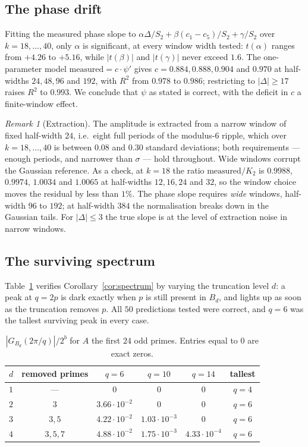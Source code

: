 \documentclass[11pt,a4paper]{article}
\theoremstyle{plain}
\theoremstyle{definition}
\theoremstyle{remark}
\newtheorem{remark}[theorem]{Remark}
\begin{document}
\subsection{The phase drift}

Fitting the measured phase slope to
$\alpha\Delta/S_2+\beta(c_1-c_5)/S_2+\gamma/S_2$ over $k=18,\dots,40$, only
$\alpha$ is significant, at every window width tested: $t(\alpha)$ ranges from
$+4.26$ to $+5.16$, while $|t(\beta)|$ and $|t(\gamma)|$ never exceed $1.6$. The
one-parameter model $\text{measured}=c\cdot\psi'$ gives $c=0.884,0.888,0.904$
and $0.970$ at half-widths $24,48,96$ and $192$, with $R^{2}$ from $0.978$ to
$0.986$; restricting to $|\Delta|\ge17$ raises $R^{2}$ to $0.993$. We conclude
that $\psi$ as stated is correct, with the deficit in $c$ a finite-window
effect.

\begin{remark}[Extraction]\label{rem:extraction}
The amplitude is extracted from a narrow window of fixed half-width $24$, i.e.\
eight full periods of the modulus-$6$ ripple, which over $k=18,\dots,40$ is
between $0.08$ and $0.30$ standard deviations; both requirements --- enough
periods, and narrower than $\sigma$ --- hold throughout. Wide windows corrupt
the Gaussian reference. As a check, at $k=18$ the ratio
$\text{measured}/K_2$ is $0.9988$, $0.9974$, $1.0034$ and $1.0065$ at
half-widths $12,16,24$ and $32$, so the window choice moves the residual by
less than $1\%$. The phase slope requires \emph{wide} windows,
half-width $96$ to $192$; at half-width $384$ the normalisation breaks down in
the Gaussian tails. For $|\Delta|\le3$ the true slope is at the level of
extraction noise in narrow windows.
\end{remark}

\subsection{The surviving spectrum}

Table~\ref{tab:spectrum} verifies Corollary~\ref{cor:spectrum} by varying the
truncation level $d$: a peak at $q=2p$ is dark exactly when $p$ is still present
in $B_d$, and lights up as soon as the truncation removes $p$. All $50$
predictions tested were correct, and $q=6$ was the tallest surviving peak in
every case.

\begin{table}[htbp]
\centering
\begin{tabular}{lccccc}
\toprule
$d$ & removed primes & $q=6$ & $q=10$ & $q=14$ & tallest\\
\midrule
$1$ & ---           & $0$ & $0$ & $0$ & $q=4$\\
$2$ & $3$           & $3.66\cdot10^{-2}$ & $0$ & $0$ & $q=6$\\
$3$ & $3,5$         & $4.22\cdot10^{-2}$ & $1.03\cdot10^{-3}$ & $0$ & $q=6$\\
$4$ & $3,5,7$       & $4.88\cdot10^{-2}$ & $1.75\cdot10^{-3}$ & $4.33\cdot10^{-4}$ & $q=6$\\
\bottomrule
\end{tabular}
\caption{$|G_{B_d}(2\pi/q)|/2^{b}$ for $A$ the first $24$ odd primes. Entries
equal to $0$ are exact zeros.}
\label{tab:spectrum}
\end{table}
\end{document}
